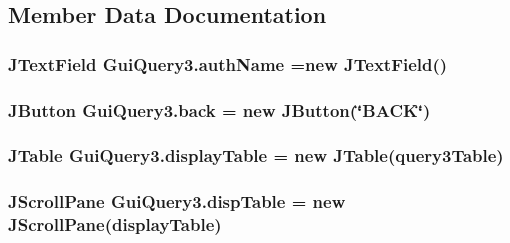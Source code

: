 \subsection{Member Data Documentation}
\subsubsection[{\texorpdfstring{auth\+Name}{authName}}]{\setlength{\rightskip}{0pt plus 5cm}J\+Text\+Field Gui\+Query3.\+auth\+Name =new J\+Text\+Field()\hspace{0.3cm}{\ttfamily [private]}}\hypertarget{classGuiQuery3_aa3273681bd3a7b3b44b36fd2b2fddcd4}{}\label{classGuiQuery3_aa3273681bd3a7b3b44b36fd2b2fddcd4}
\subsubsection[{\texorpdfstring{back}{back}}]{\setlength{\rightskip}{0pt plus 5cm}J\+Button Gui\+Query3.\+back = new J\+Button(\char`\"{}B\+A\+CK\char`\"{})\hspace{0.3cm}{\ttfamily [private]}}\hypertarget{classGuiQuery3_aa545da5c2e8152ea18c51297734a6910}{}\label{classGuiQuery3_aa545da5c2e8152ea18c51297734a6910}
\subsubsection[{\texorpdfstring{display\+Table}{displayTable}}]{\setlength{\rightskip}{0pt plus 5cm}J\+Table Gui\+Query3.\+display\+Table = new J\+Table({\bf query3\+Table})\hspace{0.3cm}{\ttfamily [private]}}\hypertarget{classGuiQuery3_a868222082fb015a87bac64a3c671389d}{}\label{classGuiQuery3_a868222082fb015a87bac64a3c671389d}
\subsubsection[{\texorpdfstring{disp\+Table}{dispTable}}]{\setlength{\rightskip}{0pt plus 5cm}J\+Scroll\+Pane Gui\+Query3.\+disp\+Table = new J\+Scroll\+Pane({\bf display\+Table})\hspace{0.3cm}{\ttfamily [private]}}\hypertarget{classGuiQuery3_acd36b4ab5f212d4a4fae20d4a8ffcba4}{}\label{classGuiQuery3_acd36b4ab5f212d4a4fae20d4a8ffcba4}
